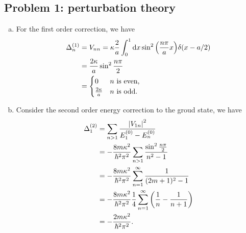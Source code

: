 \documentclass[10pt]{article}
\begin{document}
\subsection{Problem 1: perturbation theory}
\begin{enumerate}[(a)]
	\item For the first order correction, we have 
		\begin{align*}
			\Delta_n^{(1)} &= V_{nn} = \kappa \frac{2}{a} \int_0^1 \dd{x} \sin^2\qty(\frac{n\pi}{a}x) \delta(x - a /2)\\
						   &= \frac{2 \kappa}{a} \sin^2{\frac{n\pi}{2}} \\
						   &= \begin{cases}
							   0 & \text{$n$ is even,} \\
							   \frac{2\kappa}{a} & \text{$n$ is odd.}
						   \end{cases}
		\end{align*}
	\item Consider the second order energy correction to the groud state, we have
		\begin{align*}
			\Delta_1^{(2)} &= \sum_{n > 1} \frac{\abs{V_{1n}}^2}{E_1^{(0)} - E_n^{(0)}} \\
						   &= - \frac{8m\kappa^2}{\hbar^2 \pi^2}\sum_{n > 1} \frac{\sin^2{\frac{n\pi}{2}}}{n^2 - 1} \\
						   &= - \frac{8m\kappa^2}{\hbar^2 \pi^2} \sum_{n = 1}^{\infty} \frac{1}{(2m+1)^2 - 1} \\
						   &= - \frac{8m\kappa^2}{\hbar^2 \pi^2} \frac{1}{4} \sum_{n = 1}^{\infty}\qty(\frac{1}{n} - \frac{1}{n+1}) \\
						   &= - \frac{2m\kappa^2}{\hbar^2 \pi^2}.
		\end{align*}
\end{enumerate}
\end{document}
